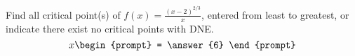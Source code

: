 \documentclass{ximera}
\author{Gregory Hartman \and Matthew Carr}
\begin{document}
\begin{exercise}




Find all critical point(s) of $f(x)=\frac{(x-2)^{2/3}}{x}$, entered from least to greatest, or indicate there exist no critical points with DNE.
\[
x
\begin{prompt}
= \answer{6}
\end{prompt}
\]


\end{exercise}
\end{document}
